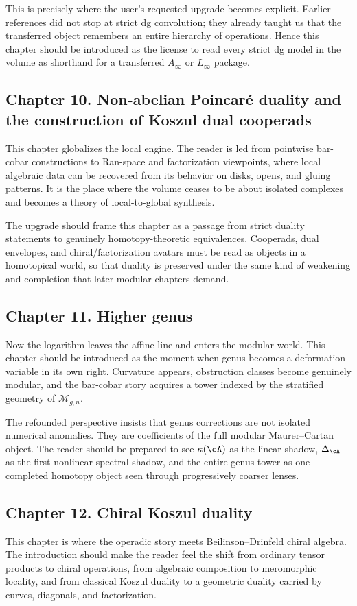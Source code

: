 This is precisely where the user's requested upgrade becomes explicit.  Earlier references did not stop at strict dg convolution; they already taught us that the transferred object remembers an entire hierarchy of operations.  Hence this chapter should be introduced as the license to read every strict dg model in the volume as shorthand for a transferred $A_\infty$ or $L_\infty$ package.

\subsection*{Chapter 10. Non-abelian Poincaré duality and the construction of Koszul dual cooperads}
This chapter globalizes the local engine.  The reader is led from pointwise bar-cobar constructions to Ran-space and factorization viewpoints, where local algebraic data can be recovered from its behavior on disks, opens, and gluing patterns.  It is the place where the volume ceases to be about isolated complexes and becomes a theory of local-to-global synthesis.

The upgrade should frame this chapter as a passage from strict duality statements to genuinely homotopy-theoretic equivalences.  Cooperads, dual envelopes, and chiral/factorization avatars must be read as objects in a homotopical world, so that duality is preserved under the same kind of weakening and completion that later modular chapters demand.

\subsection*{Chapter 11. Higher genus}
Now the logarithm leaves the affine line and enters the modular world.  This chapter should be introduced as the moment when genus becomes a deformation variable in its own right.  Curvature appears, obstruction classes become genuinely modular, and the bar-cobar story acquires a tower indexed by the stratified geometry of $\overline{\mathcal M}_{g,n}$.

The refounded perspective insists that genus corrections are not isolated numerical anomalies.  They are coefficients of the full modular Maurer--Cartan object.  The reader should be prepared to see $\kappa(\cA)$ as the linear shadow, $\Delta_{\cA}$ as the first nonlinear spectral shadow, and the entire genus tower as one completed homotopy object seen through progressively coarser lenses.

\subsection*{Chapter 12. Chiral Koszul duality}
This chapter is where the operadic story meets Beilinson--Drinfeld chiral algebra.  The introduction should make the reader feel the shift from ordinary tensor products to chiral operations, from algebraic composition to meromorphic locality, and from classical Koszul duality to a geometric duality carried by curves, diagonals, and factorization.


